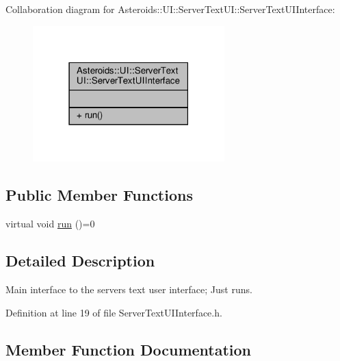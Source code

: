 Collaboration diagram for Asteroids\+:\+:UI\+:\+:Server\+Text\+UI\+:\+:Server\+Text\+U\+I\+Interface\+:\nopagebreak
\begin{figure}[H]
\begin{center}
\leavevmode
\includegraphics[width=210pt]{classAsteroids_1_1UI_1_1ServerTextUI_1_1ServerTextUIInterface__coll__graph}
\end{center}
\end{figure}
\subsection*{Public Member Functions}
\begin{DoxyCompactItemize}
\item 
virtual void \hyperlink{classAsteroids_1_1UI_1_1ServerTextUI_1_1ServerTextUIInterface_a81f61d1e1c051c0f83fe716fee7247d3}{run} ()=0
\end{DoxyCompactItemize}


\subsection{Detailed Description}
Main interface to the server\textquotesingle{}s text user interface; Just runs. 

Definition at line 19 of file Server\+Text\+U\+I\+Interface.\+h.



\subsection{Member Function Documentation}
\mbox{\label{classAsteroids_1_1UI_1_1ServerTextUI_1_1ServerTextUIInterface_a81f61d1e1c051c0f83fe716fee7247d3}} 
